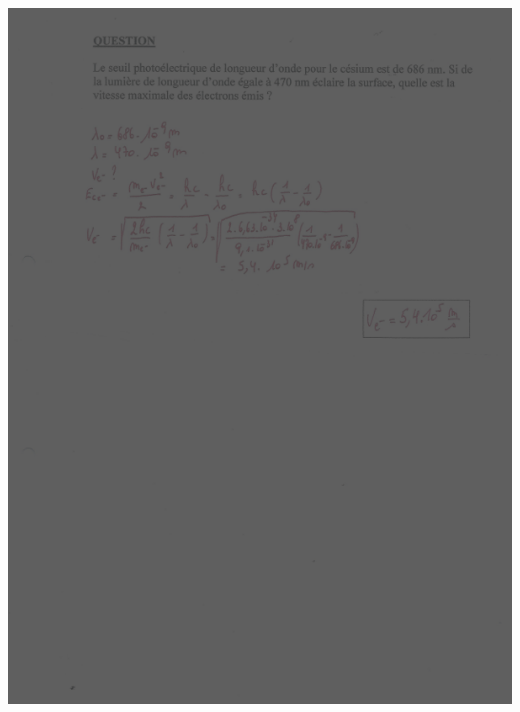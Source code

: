 {\includegraphics[width=17.498cm,height=24.13cm]{Pictures/10000001000002570000033B5842099DBC063D07.png}

}

